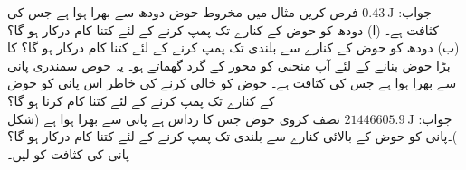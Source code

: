جواب:\quad
$\SI{0.43}{\joule}$
فرض کریں مثال  میں مخروط حوض دودھ سے بھرا ہوا ہے جس کی کثافت  ہے۔ (ا) دودھ کو حوض کے کنارے تک پمپ کرنے کے لئے کتنا کام درکار ہو گا؟  (ب) دودھ کو حوض کے کنارے سے  بلندی تک پمپ کرنے کے لئے کتنا کام درکار ہو گا؟
 کا بڑا حوض بنانے کے لئے آپ
 منحنی  کو محور  کے گرد گھماتے ہو۔ یہ حوض سمندری پانی سے بھرا ہوا ہے جس کی کثافت  ہے۔ حوض کو خالی کرنے کی خاطر اس پانی کو حوض کے کنارے تک پمپ کرنے کے لئے کتنا کام کرنا ہو گا؟\\
جواب:\quad
$\SI{21446605.9}{\joule}$
نصف کروی حوض جس کا رداس  ہے پانی سے بھرا ہوا ہے (شکل )۔پانی کو حوض کے بالائی کنارے سے  بلندی تک پمپ کرنے کے لئے کتنا کام درکار ہو گا؟ پانی کی کثافت کو  لیں۔
